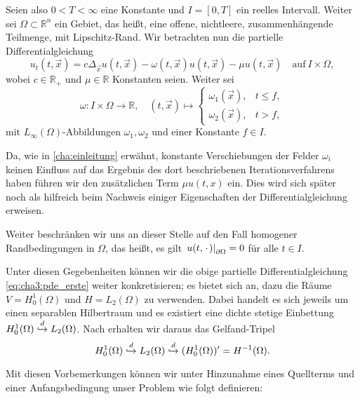 Seien also $0 < T < \infty$ eine Konstante und $I = [0, T]$ ein reelles Intervall.
Weiter sei $\Omega \subset \mathbb{R}^{n}$ ein Gebiet, das heißt, eine offene, nichtleere, zusammenhängende Teilmenge, mit Lipschitz-Rand.
Wir betrachten nun die partielle Differentialgleichung
\begin{equation}
\label{eq:cha3:pde_erste}
    u_{t}(t, \vec{x}) = c \Delta_{\vec{x}} u(t, \vec{x}) - \omega(t, \vec{x}) u(t, \vec{x}) - \mu u(t, \vec{x}) \quad \text{auf}~I \times \Omega,
\end{equation}
wobei $c \in \mathbb{R}_{+}$ und $\mu \in \mathbb{R}$ Konstanten seien.
Weiter sei
\begin{equation}
\label{eq:pp:def_omega}
    \omega \colon I \times \Omega \to \mathbb{R}, \quad (t, \vec{x}) \mapsto
    \begin{cases}
        \omega_{1}(\vec{x}), & t \leq f, \\
        \omega_{2}(\vec{x}), & t > f,
    \end{cases}
\end{equation}
mit $L_{\infty}(\Omega)$-Abbildungen $\omega_{1}, \omega_{2}$ und einer Konstante $f \in I$.

Da, wie in \autoref{cha:einleitung} erwähnt, konstante Verschiebungen der Felder $\omega_{i}$ keinen Einfluss auf das Ergebnis des dort beschriebenen Iterationsverfahrens haben führen wir den zusätzlichen Term $\mu u(t, x)$ ein.
Dies wird sich später noch als hilfreich beim Nachweis einiger Eigenschaften der Differentialgleichung erweisen.

Weiter beschränken wir uns an dieser Stelle auf den Fall homogener Randbedingungen in $\Omega$, das heißt, es gilt $\left.u(t, {\mkern2mu\cdot\mkern2mu})\right|_{\partial \Omega} = 0$ für alle $t \in I$.

Unter diesen Gegebenheiten können wir die obige partielle Differentialgleichung \eqref{eq:cha3:pde_erste} weiter konkretisieren; es bietet sich an, dazu die Räume $V = H^{1}_{0}(\Omega)$ und $H = L_{2}(\Omega)$ zu verwenden.
Dabei handelt es sich jeweils um einen separablen Hilbertraum und es existiert eine dichte stetige Einbettung $H^{1}_{0}(\Omega) \stackrel{d}{\hookrightarrow} L_{2}(\Omega)$.
Nach  erhalten wir daraus das Gelfand-Tripel
\begin{equation}
\label{eq:cha3:gelfand_triple}
    H^{1}_{0}(\Omega) \stackrel{d}{\hookrightarrow} L_{2}(\Omega) \stackrel{d}{\hookrightarrow} (H^{1}_{0}(\Omega))' = H^{-1}(\Omega).
\end{equation}

Mit diesen Vorbemerkungen können wir unter Hinzunahme eines Quellterms und einer Anfangsbedingung unser Problem wie folgt definieren:

